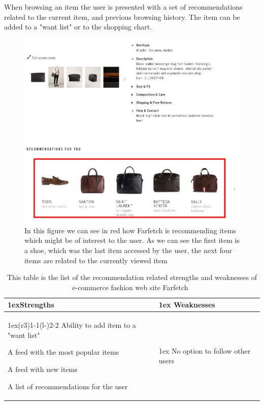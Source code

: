     When browsing an item the user is presented with a set of recommendations related to the current item, and previous browsing history.
    The item can be added to a "want list" or to the shopping chart.
    \begin{figure}[H]
        \centering
        \includegraphics[width=5in]{image/farfetchedRecommendationExample.png}
        \caption[Example of Farfetch's recommendations]{In this figure we can see in red how Farfetch is recommending items which might be of interest to the user. As we can see the first item is a shoe, which was the last item accessed by the user, the next four items are related to the currently viewed item}
        \label{figure:farfetchedRecommendationExample}
    \end{figure}
    \begin{table}[H]
        \centering
        \begin{tabularx}{\linewidth}{>{\parskip1ex}X@{\kern4\tabcolsep}>{\parskip1ex}X}
        	\toprule
        	\hfil\bfseries Strengths
        	&
        	\hfil\bfseries Weaknesses
        		\\\cmidrule(r{3\tabcolsep}){1-1}\cmidrule(l{-\tabcolsep}){2-2}
                Ability to add item to a "want list" \par
                A feed with the most popular items \par
                A feed with new items \par
                A list of recommendations for the user \par
            	&
                No option to follow other users \par
             \\\bottomrule
        \end{tabularx}
        \caption[Recommendation related strengths and weaknesses of Farfetch~\cite{Farfetch}]{This table is the list of the recommendation related strengths and weaknesses of e-commerce fashion web site Farfetch~\cite{Farfetch}}
        \label{table:ecommenreceFarfetch}
    \end{table}

